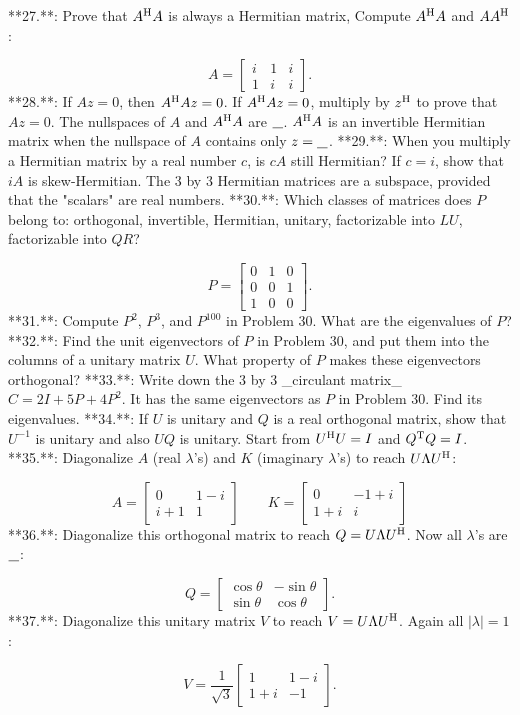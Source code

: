 

**27.**: Prove that \(A^{\rm H}A\) is always a Hermitian matrix, Compute \(A^{\rm H}A\) and \(AA^{\rm H}\):

\[A=\begin{bmatrix}i&1&i\\ 1&i&i\end{bmatrix}.\]
**28.**: If \(Az=0\), then \(A^{\rm H}Az=0\). If \(A^{\rm H}Az=0\), multiply by \(z^{\rm H}\) to prove that \(Az=0\). The nullspaces of \(A\) and \(A^{\rm H}A\) are \(\underline{\phantom{\rm H}}\). \(A^{\rm H}A\) is an invertible Hermitian matrix when the nullspace of \(A\) contains only \(z=\underline{\phantom{\rm H}}\).
**29.**: When you multiply a Hermitian matrix by a real number \(c\), is \(cA\) still Hermitian? If \(c=i\), show that \(iA\) is skew-Hermitian. The 3 by 3 Hermitian matrices are a subspace, provided that the "scalars" are real numbers.
**30.**: Which classes of matrices does \(P\) belong to: orthogonal, invertible, Hermitian, unitary, factorizable into \(LU\), factorizable into \(QR\)?

\[P=\begin{bmatrix}0&1&0\\ 0&0&1\\ 1&0&0\end{bmatrix}.\]
**31.**: Compute \(P^{2}\), \(P^{3}\), and \(P^{100}\) in Problem 30. What are the eigenvalues of \(P\)?
**32.**: Find the unit eigenvectors of \(P\) in Problem 30, and put them into the columns of a unitary matrix \(U\). What property of \(P\) makes these eigenvectors orthogonal?
**33.**: Write down the 3 by 3 _circulant matrix_\(C=2I+5P+4P^{2}\). It has the same eigenvectors as \(P\) in Problem 30. Find its eigenvalues.
**34.**: If \(U\) is unitary and \(Q\) is a real orthogonal matrix, show that \(U^{-1}\) is unitary and also \(UQ\) is unitary. Start from \(U^{\rm H}U=I\) and \(Q^{\rm T}Q=I\).
**35.**: Diagonalize \(A\) (real \(\lambda\)'s) and \(K\) (imaginary \(\lambda\)'s) to reach \(U\Lambda U^{\rm H}\):

\[A=\begin{bmatrix}0&1-i\\ i+1&1\end{bmatrix}\qquad K=\begin{bmatrix}0&-1+i\\ 1+i&i\end{bmatrix}\]
**36.**: Diagonalize this orthogonal matrix to reach \(Q=U\Lambda U^{\rm H}\). Now all \(\lambda\)'s are \(\underline{\phantom{\rm H}}\):

\[Q=\begin{bmatrix}\cos\theta&-\sin\theta\\ \sin\theta&\cos\theta\end{bmatrix}.\]
**37.**: Diagonalize this unitary matrix \(V\) to reach \(V=U\Lambda U^{\rm H}\). Again all \(|\lambda|=1\):

\[V=\frac{1}{\sqrt{3}}\begin{bmatrix}1&1-i\\ 1+i&-1\end{bmatrix}.\]